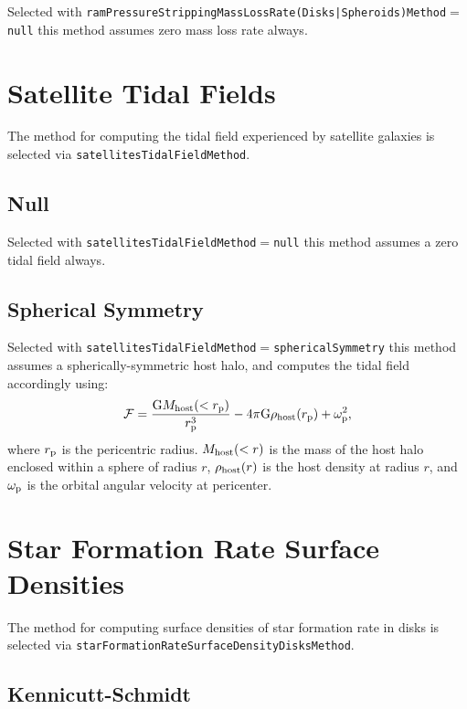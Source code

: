 Selected with {\tt ramPressureStrippingMassLossRate(Disks|Spheroids)Method}$=${\tt null} this method assumes zero mass loss rate always.

\section{Satellite Tidal Fields}\label{sec:SatelliteTidalFields}

The method for computing the tidal field experienced by satellite galaxies is selected via {\tt satellitesTidalFieldMethod}.

\subsection{Null}

Selected with {\tt satellitesTidalFieldMethod}$=${\tt null} this method assumes a zero tidal field always.

\subsection{Spherical Symmetry}

Selected with {\tt satellitesTidalFieldMethod}$=${\tt sphericalSymmetry} this method assumes a spherically-symmetric host halo, and computes the tidal field accordingly using:
\begin{equation}
 \mathcal{F} = {{\rm G} M_{\rm host}(<r_{\rm p}) \over r_{\rm p}^3} - 4 \pi {\rm G} \rho_{\rm host}(r_{\rm p}) + \omega_{\rm p}^2,
\end{equation}
where $r_{\rm p}$ is the pericentric radius. $M_{\rm host}(<r)$ is the mass of the host halo enclosed within a sphere of radius $r$, $\rho_{\rm host}(r)$ is the host density at radius $r$, and $\omega_{\rm p}$ is the orbital angular velocity at pericenter.

\section{Star Formation Rate Surface Densities}\label{sec:StarFormationRateSurfaceDensity}

The method for computing surface densities of star formation rate in disks is selected via {\tt starFormationRateSurfaceDensityDisksMethod}.

\subsection{Kennicutt-Schmidt}\label{sec:StarFormationKennicuttSchmidt}

